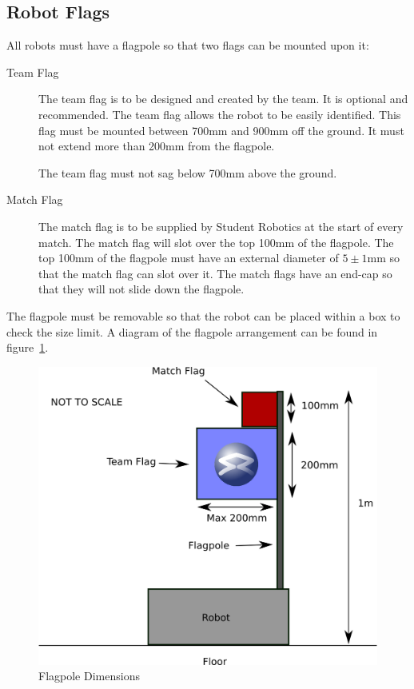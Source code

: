 \subsection{Robot Flags}
\label{sec:flags}
All robots must have a flagpole so that two flags can be mounted upon it:
\begin{description}
\item[Team Flag] The team flag is to be designed and created by the team.  It is optional and recommended.  The team flag allows the robot to be easily identified.  This flag must be mounted between 700mm and 900mm off the ground.  It must not extend more than 200mm from the flagpole.

The team flag must not sag below 700mm above the ground.
\item[Match Flag] The match flag is to be supplied by Student Robotics at the start of every match.  The match flag will slot over the top 100mm of the flagpole.  The top 100mm of the flagpole must have an external diameter of $5\pm1$mm so that the match flag can slot over it.  The match flags have an end-cap so that they will not slide down the flagpole.
\end{description}

The flagpole must be removable so that the robot can be placed within a box to check the size limit.  A diagram of the flagpole arrangement can be found in figure~\ref{fig:flag}.

\begin{figure}
\begin{center}
\includegraphics[keepaspectratio, scale =1]{./images/flag.png}
\caption{\label{fig:flag}Flagpole Dimensions}
\end{center}
\end{figure}
\clearpage